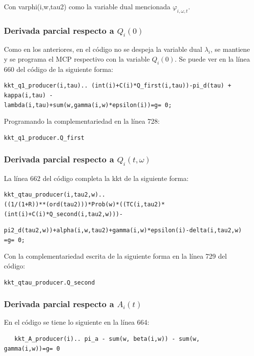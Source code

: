 Con varphi(i,w,tau2) como la variable dual mencionada $\varphi_{i,\omega,t}$. 

\subsubsection{Derivada parcial respecto a $Q_i(0)$}

Como en los anteriores, en el código no se despeja la variable dual $\lambda_i$, se mantiene y se programa el MCP respectivo con la variable $Q_i(0)$. Se puede ver en la línea 660 del código de la siguiente forma:

\begin{verbatim}
kkt_q1_producer(i,tau).. (int(i)+C(i)*Q_first(i,tau))-pi_d(tau) + kappa(i,tau) - 
lambda(i,tau)+sum(w,gamma(i,w)*epsilon(i))=g= 0;
\end{verbatim}

Programando la complementariedad en la línea 728:

\begin{verbatim}
kkt_q1_producer.Q_first    
\end{verbatim}

\subsubsection{Derivada parcial respecto a $Q_i(t,\omega)$}

La línea 662 del código completa la kkt de la siguiente forma: 

\begin{verbatim}
kkt_qtau_producer(i,tau2,w).. 
((1/(1+R))**(ord(tau2)))*Prob(w)*((TC(i,tau2)*(int(i)+C(i)*Q_second(i,tau2,w)))- 
\end{verbatim}
\begin{verbatim}
pi2_d(tau2,w))+alpha(i,w,tau2)+gamma(i,w)*epsilon(i)-delta(i,tau2,w) =g= 0;
\end{verbatim}

Con la complementariedad escrita de la siguiente forma en la línea 729 del código:
\begin{verbatim}
kkt_qtau_producer.Q_second    
\end{verbatim}

\subsubsection{Derivada parcial respecto a $A_i(t)$}

En el código se tiene lo siguiente en la línea 664:
\begin{verbatim}
   kkt_A_producer(i).. pi_a - sum(w, beta(i,w)) - sum(w, gamma(i,w))=g= 0 
\end{verbatim}

